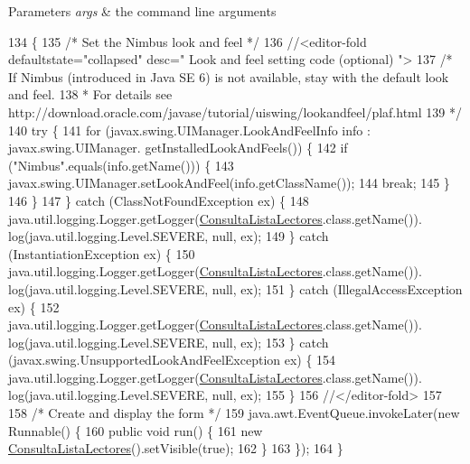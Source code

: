 \begin{DoxyParams}{Parameters}
{\em args} & the command line arguments \\
\hline
\end{DoxyParams}

\begin{DoxyCode}
134                                            \{
135         \textcolor{comment}{/* Set the Nimbus look and feel */}
136         \textcolor{comment}{//<editor-fold defaultstate="collapsed" desc=" Look and feel setting code (optional) ">}
137         \textcolor{comment}{/* If Nimbus (introduced in Java SE 6) is not available, stay with the default look and feel.}
138 \textcolor{comment}{         * For details see http://download.oracle.com/javase/tutorial/uiswing/lookandfeel/plaf.html }
139 \textcolor{comment}{         */}
140         \textcolor{keywordflow}{try} \{
141             \textcolor{keywordflow}{for} (javax.swing.UIManager.LookAndFeelInfo info : javax.swing.UIManager.
      getInstalledLookAndFeels()) \{
142                 \textcolor{keywordflow}{if} (\textcolor{stringliteral}{"Nimbus"}.equals(info.getName())) \{
143                     javax.swing.UIManager.setLookAndFeel(info.getClassName());
144                     \textcolor{keywordflow}{break};
145                 \}
146             \}
147         \} \textcolor{keywordflow}{catch} (ClassNotFoundException ex) \{
148             java.util.logging.Logger.getLogger(\mbox{\hyperlink{class_interfaz_package_1_1_consulta_lista_lectores_a2068efbdca2416de4628a028be002f0c}{ConsultaListaLectores}}.class.getName()).
      log(java.util.logging.Level.SEVERE, null, ex);
149         \} \textcolor{keywordflow}{catch} (InstantiationException ex) \{
150             java.util.logging.Logger.getLogger(\mbox{\hyperlink{class_interfaz_package_1_1_consulta_lista_lectores_a2068efbdca2416de4628a028be002f0c}{ConsultaListaLectores}}.class.getName()).
      log(java.util.logging.Level.SEVERE, null, ex);
151         \} \textcolor{keywordflow}{catch} (IllegalAccessException ex) \{
152             java.util.logging.Logger.getLogger(\mbox{\hyperlink{class_interfaz_package_1_1_consulta_lista_lectores_a2068efbdca2416de4628a028be002f0c}{ConsultaListaLectores}}.class.getName()).
      log(java.util.logging.Level.SEVERE, null, ex);
153         \} \textcolor{keywordflow}{catch} (javax.swing.UnsupportedLookAndFeelException ex) \{
154             java.util.logging.Logger.getLogger(\mbox{\hyperlink{class_interfaz_package_1_1_consulta_lista_lectores_a2068efbdca2416de4628a028be002f0c}{ConsultaListaLectores}}.class.getName()).
      log(java.util.logging.Level.SEVERE, null, ex);
155         \}
156         \textcolor{comment}{//</editor-fold>}
157 
158         \textcolor{comment}{/* Create and display the form */}
159         java.awt.EventQueue.invokeLater(\textcolor{keyword}{new} Runnable() \{
160             \textcolor{keyword}{public} \textcolor{keywordtype}{void} run() \{
161                 \textcolor{keyword}{new} \mbox{\hyperlink{class_interfaz_package_1_1_consulta_lista_lectores_a2068efbdca2416de4628a028be002f0c}{ConsultaListaLectores}}().setVisible(\textcolor{keyword}{true});
162             \}
163         \});
164     \}
\end{DoxyCode}


